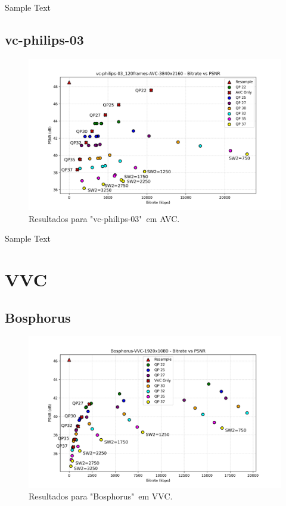 Sample Text

\newpage

\subsection{vc-philips-03}

\begin{figure}[h]
    \centering
    \includegraphics[width=1.0\textwidth]{img/vc-philips-03_120frames-AVC.png}
    \caption{Resultados para "vc-philips-03"\ em \acrshort{AVC}.}
    \label{fig:vc-philips-03}
\end{figure}

Sample Text

\newpage

\section{VVC}

\subsection{Bosphorus}

\begin{figure}[h]
    \centering
    \includegraphics[width=1.0\textwidth]{img/Bosphorus-VVC.png}
    \caption{Resultados para "Bosphorus"\ em \acrshort{VVC}. \cite{uvg_dataset}}
    \label{fig:Bosphorus-VVC}
\end{figure}

